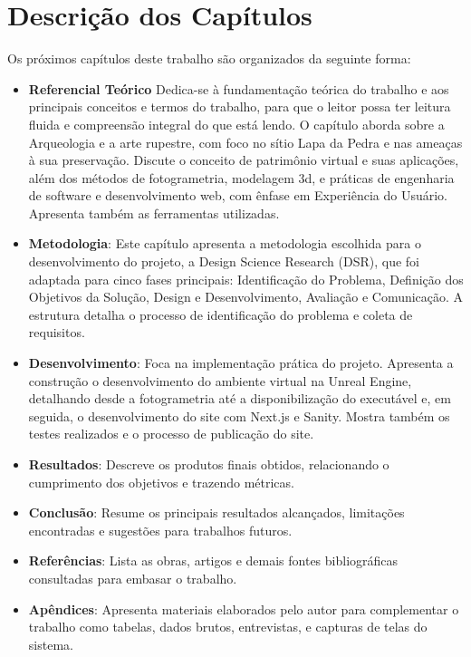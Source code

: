 \section{Descrição dos Capítulos}
Os próximos capítulos deste trabalho são organizados da seguinte forma:
\begin{itemize}
    \item \textbf{Referencial Teórico}
    Dedica-se à fundamentação teórica do trabalho e aos principais conceitos e termos do trabalho, para que o leitor possa ter leitura fluida e compreensão integral do que está lendo. O capítulo aborda sobre a Arqueologia e a arte rupestre, com foco no sítio Lapa da Pedra e nas ameaças à sua preservação. Discute o conceito de patrimônio virtual e suas aplicações, além dos métodos de fotogrametria, modelagem \gls{3d}, e práticas de engenharia de software e desenvolvimento web, com ênfase em Experiência do Usuário. Apresenta também as ferramentas utilizadas.
    
    \item \textbf{Metodologia}: Este capítulo apresenta a metodologia escolhida para o desenvolvimento do projeto, a Design Science Research (DSR), que foi adaptada para cinco fases principais: Identificação do Problema, Definição dos Objetivos da Solução, Design e Desenvolvimento, Avaliação e Comunicação.  A estrutura detalha o processo de identificação do problema e coleta de requisitos.

    
    \item \textbf{Desenvolvimento}: Foca na implementação prática do projeto. Apresenta a construção o desenvolvimento do ambiente virtual na Unreal Engine, detalhando desde a fotogrametria até a disponibilização do executável e, em seguida, o desenvolvimento  do site com Next.js e Sanity. Mostra também os testes realizados e o processo de publicação do site.
    
    \item \textbf{Resultados}: Descreve os produtos finais obtidos, relacionando o cumprimento dos objetivos e trazendo métricas.
    \item \textbf{Conclusão}: Resume os principais resultados alcançados, limitações encontradas e sugestões para trabalhos futuros.
    \item \textbf{Referências}: Lista as obras, artigos e demais fontes bibliográficas consultadas para embasar o trabalho.
    
    \item \textbf{Apêndices}: Apresenta materiais elaborados pelo autor para complementar o trabalho como tabelas, dados brutos, entrevistas, e capturas de telas do sistema.
    
\end{itemize}

